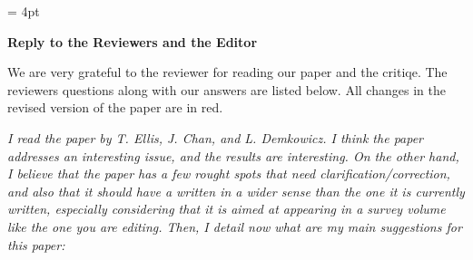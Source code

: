 \documentclass[11pt,c]{article}
\theoremstyle{remark}
\begin{document}
\baselineskip=16pt
\parskip= 4pt


\begin{center}
{\large \bf Reply to the Reviewers and the Editor}
\end{center}

We are very grateful to the reviewer for reading our paper and the critiqe. The reviewers
questions along with our answers are listed below. All changes in the revised version
of the paper are in red.




{\em 
I read the paper by T. Ellis, J. Chan, and L. Demkowicz. I think the paper addresses
an interesting issue, and the results are interesting. On the other hand, I believe
that the paper has a few rought spots that need clarification/correction, and also that
it should have a written in a wider sense than the one it is currently written, especially
considering that it is aimed at appearing in a survey volume like the one you are editing.
Then, I detail now what are my main suggestions for this paper:}
\end{document}
